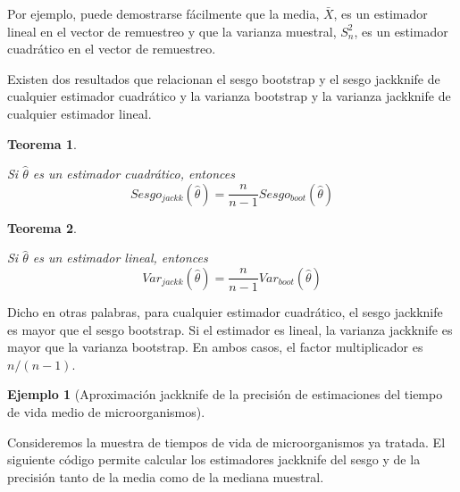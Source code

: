 \documentclass[
]{book}
\theoremstyle{break}
\newtheorem{theorem}{Teorema}[chapter]
\theoremstyle{definition}
\theoremstyle{definition}
\newtheorem{example}{Ejemplo}[chapter]
\theoremstyle{definition}
\theoremstyle{remark}
\begin{document}
Por ejemplo, puede demostrarse fácilmente que la media, \(\bar{X}\),
es un estimador lineal en el vector de remuestreo y que la varianza
muestral, \(S_n^2\), es un estimador cuadrático en el vector de
remuestreo.

Existen dos resultados que relacionan el sesgo bootstrap y el sesgo
jackknife de cualquier estimador cuadrático y la varianza bootstrap y la
varianza jackknife de cualquier estimador lineal.

\begin{theorem}
\protect\hypertarget{thm:jack-boot-sesgo}{}{\label{thm:jack-boot-sesgo} } \vspace{0.5cm}

Si \(\hat{\theta}\) es un estimador cuadrático, entonces
\[Sesgo_{jackk}\left( \hat{\theta} \right) =\frac{n}{n-1}Sesgo_{boot}\left( 
\hat{\theta} \right)\]
\end{theorem}

\begin{theorem}
\protect\hypertarget{thm:jack-boot-precision}{}{\label{thm:jack-boot-precision} } \vspace{0.5cm}

Si \(\hat{\theta}\) es un estimador lineal, entonces
\[Var_{jackk}\left( \hat{\theta} \right) =\frac{n}{n-1}Var_{boot}\left( \hat{
\theta} \right)\]
\end{theorem}

Dicho en otras palabras, para cualquier estimador cuadrático, el sesgo
jackknife es mayor que el sesgo bootstrap. Si el estimador es lineal, la
varianza jackknife es mayor que la varianza bootstrap. En ambos casos,
el factor multiplicador es \(n/(n-1)\).

\begin{example}[Aproximación jackknife de la precisión de estimaciones del tiempo de vida medio de microorganismos]
\protect\hypertarget{exm:estimacion-jack-precision}{}{\label{exm:estimacion-jack-precision} \iffalse (Aproximación jackknife de la precisión de estimaciones del tiempo de vida medio de microorganismos) \fi{} } \vspace{0.5cm}

Consideremos la muestra de tiempos de vida de microorganismos ya
tratada. El siguiente código permite calcular los
estimadores jackknife del sesgo y de la precisión tanto de la media como
de la mediana muestral.
\end{example}
\end{document}
